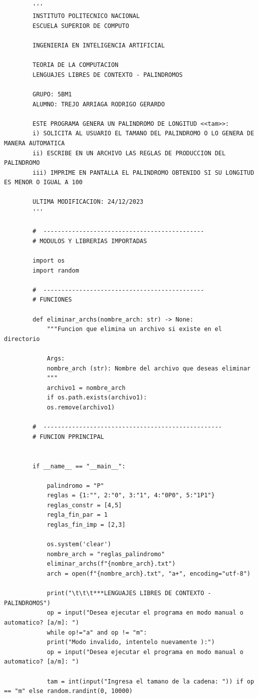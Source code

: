 \documentclass[11pt]{article} %
\begin{document}
	\begin{lstlisting}
		
		'''
		INSTITUTO POLITECNICO NACIONAL
		ESCUELA SUPERIOR DE COMPUTO
		
		INGENIERIA EN INTELIGENCIA ARTIFICIAL
		
		TEORIA DE LA COMPUTACION
		LENGUAJES LIBRES DE CONTEXTO - PALINDROMOS
		
		GRUPO: 5BM1
		ALUMNO: TREJO ARRIAGA RODRIGO GERARDO
		
		ESTE PROGRAMA GENERA UN PALINDROMO DE LONGITUD <<tam>>:
		i) SOLICITA AL USUARIO EL TAMANO DEL PALINDROMO O LO GENERA DE MANERA AUTOMATICA
		ii) ESCRIBE EN UN ARCHIVO LAS REGLAS DE PRODUCCION DEL PALINDROMO
		iii) IMPRIME EN PANTALLA EL PALINDROMO OBTENIDO SI SU LONGITUD ES MENOR O IGUAL A 100
		
		ULTIMA MODIFICACION: 24/12/2023
		'''
		
		#  ---------------------------------------------
		# MODULOS Y LIBRERIAS IMPORTADAS
		
		import os
		import random
		
		#  ---------------------------------------------
		# FUNCIONES
		
		def eliminar_archs(nombre_arch: str) -> None:
			"""Funcion que elimina un archivo si existe en el directorio
			
			Args:
			nombre_arch (str): Nombre del archivo que deseas eliminar
			"""
			archivo1 = nombre_arch
			if os.path.exists(archivo1):
			os.remove(archivo1)
		
		#  --------------------------------------------------
		# FUNCION PPRINCIPAL
		
		
		if __name__ == "__main__":
		
			palindromo = "P"
			reglas = {1:"", 2:"0", 3:"1", 4:"0P0", 5:"1P1"}
			reglas_constr = [4,5]
			regla_fin_par = 1
			reglas_fin_imp = [2,3]
			
			os.system('clear')
			nombre_arch = "reglas_palindromo"
			eliminar_archs(f"{nombre_arch}.txt")
			arch = open(f"{nombre_arch}.txt", "a+", encoding="utf-8")
			
			print("\t\t\t***LENGUAJES LIBRES DE CONTEXTO - PALINDROMOS")
			op = input("Desea ejecutar el programa en modo manual o automatico? [a/m]: ")
			while op!="a" and op != "m":
			print("Modo invalido, intentelo nuevamente ):")
			op = input("Desea ejecutar el programa en modo manual o automatico? [a/m]: ")
			
			tam = int(input("Ingresa el tamano de la cadena: ")) if op == "m" else random.randint(0, 10000)
			

\end{lstlisting}
\end{document}
